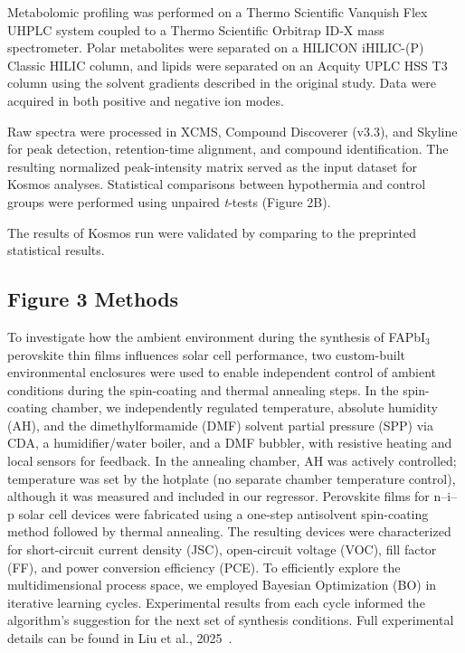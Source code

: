 \documentclass{article}
\begin{document}
Metabolomic profiling was performed on a Thermo Scientific Vanquish Flex UHPLC system coupled to a Thermo Scientific Orbitrap ID-X mass spectrometer. Polar metabolites were separated on a HILICON iHILIC-(P) Classic HILIC column, and lipids were separated on an Acquity UPLC HSS T3 column using the solvent gradients described in the original study. Data were acquired in both positive and negative ion modes.

Raw spectra were processed in XCMS, Compound Discoverer (v3.3), and Skyline for peak detection, retention-time alignment, and compound identification. The resulting normalized peak-intensity matrix served as the input dataset for Kosmos analyses. Statistical comparisons between hypothermia and control groups were performed using unpaired \textit{t}-tests (Figure 2B).

The results of Kosmos run were validated by comparing to the preprinted statistical results.

\subsection{Figure 3 Methods}

To investigate how the ambient environment during the synthesis of FAPbI$_3$ perovskite thin films influences solar cell performance, two custom-built environmental enclosures were used to enable independent control of ambient conditions during the spin-coating and thermal annealing steps. In the spin-coating chamber, we independently regulated temperature, absolute humidity (AH), and the dimethylformamide (DMF) solvent partial pressure (SPP) via CDA, a humidifier/water boiler, and a DMF bubbler, with resistive heating and local sensors for feedback. In the annealing chamber, AH was actively controlled; temperature was set by the hotplate (no separate chamber temperature control), although it was measured and included in our regressor. Perovskite films for n--i--p solar cell devices were fabricated using a one-step antisolvent spin-coating method followed by thermal annealing. The resulting devices were characterized for short-circuit current density (JSC), open-circuit voltage (VOC), fill factor (FF), and power conversion efficiency (PCE). To efficiently explore the multidimensional process space, we employed Bayesian Optimization (BO) in iterative learning cycles. Experimental results from each cycle informed the algorithm’s suggestion for the next set of synthesis conditions. Full experimental details can be found in Liu et al., 2025~\cite{liu_disentangling_2025}.
\end{document}
